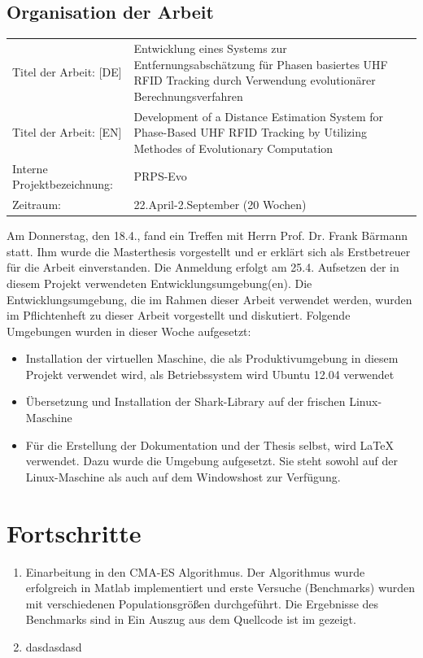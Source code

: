 ﻿\documentclass[a4paper,12pt,fleqn]{scrartcl}
\begin{document}
\subsection{Organisation der Arbeit}
\begin{table}[right]
    \renewcommand{\arraystretch}{1.5}
    \begin{tabular}{lp{11cm}}
      Titel der Arbeit:  [DE] & Entwicklung eines Systems zur Entfernungsabschätzung für Phasen basiertes UHF RFID Tracking durch Verwendung evolutionärer Berechnungsverfahren \\
      Titel der Arbeit:  [EN] & Development of a Distance Estimation System for Phase-Based UHF RFID Tracking by Utilizing Methodes of Evolutionary Computation \\
      Interne Projektbezeichnung: & PRPS-Evo      \\
      Zeitraum: & 22.April-2.September (20 Wochen)
    \end{tabular}
\end{table}
%
Am Donnerstag, den 18.4., fand ein Treffen mit Herrn Prof.
Dr. Frank Bärmann statt. Ihm wurde die Masterthesis vorgestellt und er erklärt
sich als Erstbetreuer für die Arbeit einverstanden.
\newline
%
Die Anmeldung erfolgt am 25.4.
\newline
%
Aufsetzen der in diesem Projekt verwendeten Entwicklungsumgebung(en). Die Entwicklungsumgebung, die im Rahmen dieser Arbeit verwendet werden, wurden im Pflichtenheft zu dieser Arbeit vorgestellt und diskutiert.
\newline
%
Folgende Umgebungen wurden in dieser Woche aufgesetzt:
\begin{itemize}
  \item Installation der virtuellen Maschine, die als Produktivumgebung in diesem
Projekt verwendet wird, als Betriebssystem wird Ubuntu 12.04 verwendet
  \item Übersetzung und Installation der Shark-Library auf der frischen
  Linux-Maschine
  \item Für die Erstellung der Dokumentation und der Thesis selbst, wird \LaTeX{} verwendet.
  Dazu wurde die Umgebung aufgesetzt. Sie steht sowohl auf der Linux-Maschine als auch auf dem Windowshost zur Verfügung.
\end{itemize}

\section[Fortschritte]{Fortschritte}
\begin{enumerate}
 \item Einarbeitung in den CMA-ES Algorithmus. Der Algorithmus wurde erfolgreich in Matlab
      implementiert und erste Versuche (Benchmarks) wurden mit verschiedenen Populationsgrößen durchgeführt. Die Ergebnisse des Benchmarks sind in
      Ein Auszug aus dem Quellcode ist im  gezeigt.
 \item
        dasdasdasd
\end{enumerate}
\end{document}
